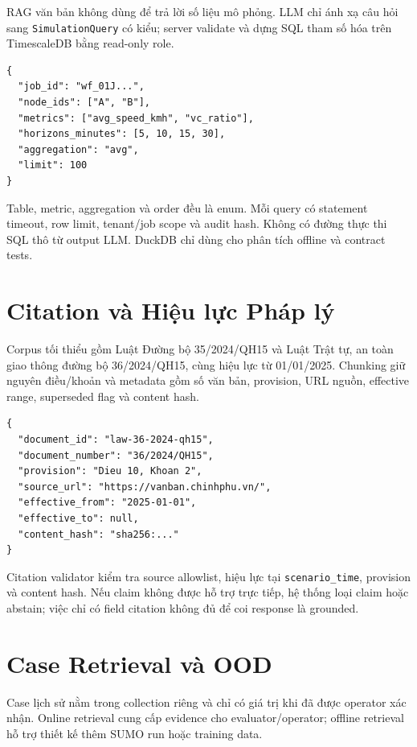 RAG văn bản không dùng để trả lời số liệu mô phỏng. LLM chỉ ánh xạ câu hỏi sang \texttt{SimulationQuery} có kiểu; server validate và dựng SQL tham số hóa trên TimescaleDB bằng read-only role.

\begin{lstlisting}[caption={SimulationQuery có kiểu},label={lst:simulation_query}]
{
  "job_id": "wf_01J...",
  "node_ids": ["A", "B"],
  "metrics": ["avg_speed_kmh", "vc_ratio"],
  "horizons_minutes": [5, 10, 15, 30],
  "aggregation": "avg",
  "limit": 100
}
\end{lstlisting}

Table, metric, aggregation và order đều là enum. Mỗi query có statement timeout, row limit, tenant/job scope và audit hash. Không có đường thực thi SQL thô từ output LLM. DuckDB chỉ dùng cho phân tích offline và contract tests.

\section{Citation và Hiệu lực Pháp lý}

Corpus tối thiểu gồm Luật Đường bộ 35/2024/QH15 và Luật Trật tự, an toàn giao thông đường bộ 36/2024/QH15, cùng hiệu lực từ 01/01/2025. Chunking giữ nguyên điều/khoản và metadata gồm số văn bản, provision, URL nguồn, effective range, superseded flag và content hash.

\begin{lstlisting}[caption={Citation có cấu trúc},label={lst:citation}]
{
  "document_id": "law-36-2024-qh15",
  "document_number": "36/2024/QH15",
  "provision": "Dieu 10, Khoan 2",
  "source_url": "https://vanban.chinhphu.vn/",
  "effective_from": "2025-01-01",
  "effective_to": null,
  "content_hash": "sha256:..."
}
\end{lstlisting}

Citation validator kiểm tra source allowlist, hiệu lực tại \texttt{scenario\_time}, provision và content hash. Nếu claim không được hỗ trợ trực tiếp, hệ thống loại claim hoặc abstain; việc chỉ có field citation không đủ để coi response là grounded.

\section{Case Retrieval và OOD}

Case lịch sử nằm trong collection riêng và chỉ có giá trị khi đã được operator xác nhận. Online retrieval cung cấp evidence cho evaluator/operator; offline retrieval hỗ trợ thiết kế thêm SUMO run hoặc training data.

